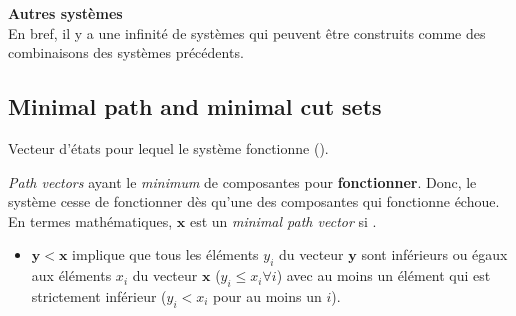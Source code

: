 \documentclass[10pt, french]{article}
\begin{document}
\begin{multicols*}{2}
\begin{definitionNOHFILL}
\begin{center}
\end{center}
\end{definitionNOHFILL}

\textbf{Autres systèmes}	\\
En bref, il y a une infinité de systèmes qui peuvent être construits comme des combinaisons des systèmes précédents.


\columnbreak
\subsection{Minimal path and minimal cut sets}
\begin{definitionNOHFILL}
Vecteur d'états pour lequel le système fonctionne (). 
\end{definitionNOHFILL}

\begin{definitionNOHFILLsub}
\og \textit{Path vectors} \fg{} ayant le \textit{minimum} de composantes pour \textbf{fonctionner}. Donc, le système cesse de fonctionner dès qu'une des composantes qui fonctionne échoue. \\

En termes mathématiques, $\bm{x}$ est un \og \textit{minimal path vector} \fg{} si . 
\begin{itemize}
	\item	$\bm{y} < \bm{x}$ implique que tous les éléments $y_{i}$ du vecteur $\bm{y}$ sont inférieurs ou égaux aux éléments $x_{i}$ du vecteur $\bm{x}$ ($y_{i} \leq x_{i} \forall i$) avec au moins un élément qui est strictement inférieur ($y_{i} < x_{i}$ pour au moins un $i$).
\end{itemize}
\end{definitionNOHFILLsub}
 

\end{multicols*}
\end{document}
